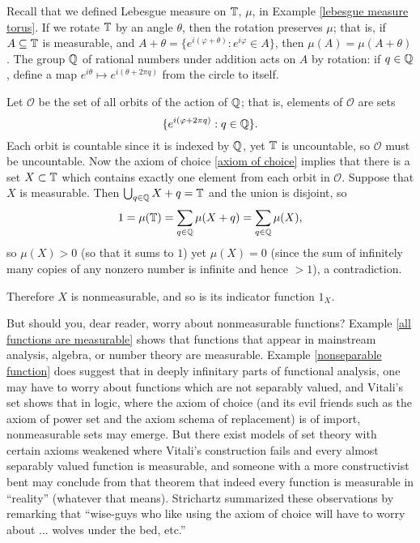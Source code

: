 \begin{example}
\label{Vitali set}
Recall that we defined Lebesgue measure on $\mathbb{T}$, $\mu$, in Example \ref{lebesgue measure torus}.
If we rotate $\mathbb{T}$ by an angle $\theta$, then the rotation preserves $\mu$; that is, if $A \subseteq \mathbb{T}$ is measurable, and $A + \theta = \{e^{i(\varphi+\theta)}: e^{i\varphi} \in A\}$, then $\mu(A) = \mu(A + \theta)$.
The group $\mathbb{Q}$ of rational numbers under addition acts on $A$ by rotation: if $q \in \mathbb{Q}$, define a map $e^{i\theta} \mapsto e^{i(\theta + 2\pi q)}$ from the circle to itself.

Let $\mathcal O$ be the set of all orbits of the action of $\mathbb{Q}$; that is, elements of $\mathcal O$ are sets
\[\{e^{i(\varphi+2\pi q)}: q \in \mathbb{Q}\}.\]
Each orbit is countable since it is indexed by $\mathbb{Q}$, yet $\mathbb{T}$ is uncountable, so $\mathcal O$ must be uncountable.
Now the axiom of choice \ref{axiom of choice} implies that there is a set $X \subset \mathbb{T}$ which contains exactly one element from each orbit in $\mathcal O$.
Suppose that $X$ is measurable. Then $\bigcup_{q \in \mathbb{Q}} X + q = \mathbb{T}$ and the union is disjoint, so
\[1 = \mu(\mathbb{T}) = \sum_{q \in \mathbb{Q}} \mu(X +  q) = \sum_{q \in \mathbb{Q}} \mu(X),\]
so $\mu(X) > 0$ (so that it sums to $1$) yet $\mu(X) = 0$ (since the sum of infinitely many copies of any nonzero number is infinite and hence $> 1$), a contradiction.

Therefore $X$ is nonmeasurable, and so is its indicator function $1_X$.
\end{example}

\begin{subsec}
But should you, dear reader, worry about nonmeasurable functions?
Example \ref{all functions are measurable} shows that functions that appear in mainstream analysis, algebra, or number theory are measurable.
Example \ref{nonseparable function} does suggest that in deeply infinitary parts of functional analysis, one may have to worry about functions which are not separably valued, and Vitali's set shows that in logic, where the axiom of choice (and its evil friends such as the axiom of power set and the axiom schema of replacement) is of import, nonmeasurable sets may emerge.
But there exist models of set theory \cite{Solovay1970} with certain axioms weakened where Vitali's construction fails and every almost separably valued function is measurable, and someone with a more constructivist bent may conclude from that theorem that indeed every function is measurable in ``reality'' (whatever that means).
Strichartz \cite[Chapter 1]{strichartz2003guide} summarized these observations by remarking that ``wise-guys who like using the axiom of choice will have to worry about ... wolves under the bed, etc.''
\end{subsec}

